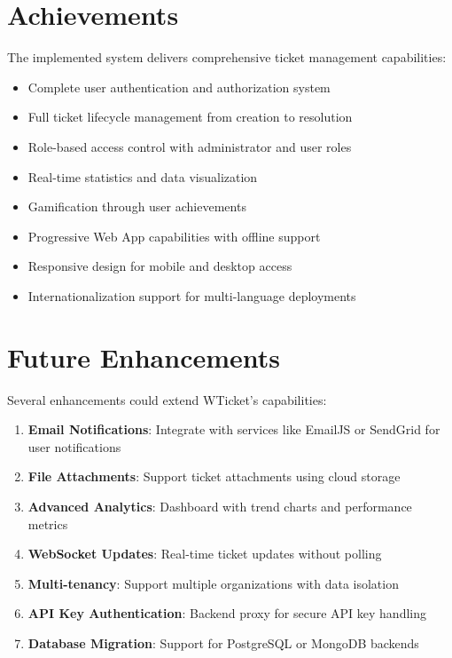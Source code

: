 \documentclass[12pt,a4paper]{report}
\begin{document}
\section{Achievements}
\label{sec:achievements}

The implemented system delivers comprehensive ticket management capabilities:

\begin{itemize}
    \item Complete user authentication and authorization system
    \item Full ticket lifecycle management from creation to resolution
    \item Role-based access control with administrator and user roles
    \item Real-time statistics and data visualization
    \item Gamification through user achievements
    \item Progressive Web App capabilities with offline support
    \item Responsive design for mobile and desktop access
    \item Internationalization support for multi-language deployments
\end{itemize}

\section{Future Enhancements}
\label{sec:future}

Several enhancements could extend WTicket's capabilities:

\begin{enumerate}
    \item \textbf{Email Notifications}: Integrate with services like EmailJS or SendGrid for user notifications
    \item \textbf{File Attachments}: Support ticket attachments using cloud storage
    \item \textbf{Advanced Analytics}: Dashboard with trend charts and performance metrics
    \item \textbf{WebSocket Updates}: Real-time ticket updates without polling
    \item \textbf{Multi-tenancy}: Support multiple organizations with data isolation
    \item \textbf{API Key Authentication}: Backend proxy for secure API key handling
    \item \textbf{Database Migration}: Support for PostgreSQL or MongoDB backends
\end{enumerate}
\end{document}
